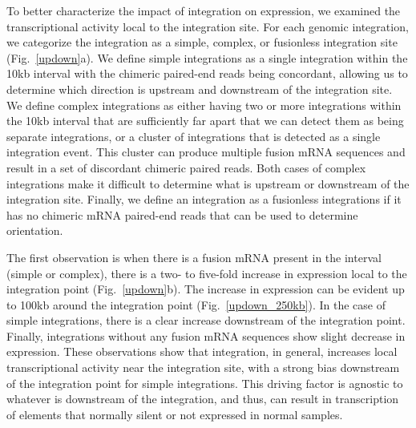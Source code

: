 \documentclass[10pt]{article}
\begin{document}
To better characterize the impact of integration on expression, we examined the transcriptional activity local to the integration site.  For each genomic integration, we categorize the integration as a simple, complex, or fusionless integration site (Fig.~\ref{updown}a).  We define simple integrations as a single integration within the 10kb interval with the chimeric paired-end reads being concordant, allowing us to determine which direction is upstream and downstream of the integration site.  We define complex integrations as either having two or more integrations within the 10kb interval that are sufficiently far apart that we can detect them as being separate integrations, or a cluster of integrations that is detected as a single integration event.  This cluster can produce multiple fusion mRNA sequences and result in a set of discordant chimeric paired reads.  Both cases of complex integrations make it difficult to determine what is upstream or downstream of the integration site.  Finally, we define an integration as a fusionless integrations if it has no chimeric mRNA paired-end reads that can be used to determine orientation.

The first observation is when there is a fusion mRNA present in the interval (simple or complex), there is a two- to five-fold increase in expression local to the integration point (Fig.~\ref{updown}b).  The increase in expression can be evident up to 100kb around the integration point (Fig.~\ref{updown_250kb}).  In the case of simple integrations, there is a clear increase downstream of the integration point.  Finally, integrations without any fusion mRNA sequences show slight decrease in expression.  These observations show that integration, in general, increases local transcriptional activity near the integration site, with a strong bias downstream of the integration point for simple integrations.  This driving factor is agnostic to whatever is downstream of the integration, and thus, can result in transcription of elements that normally silent or not expressed in normal samples. 
\end{document}
